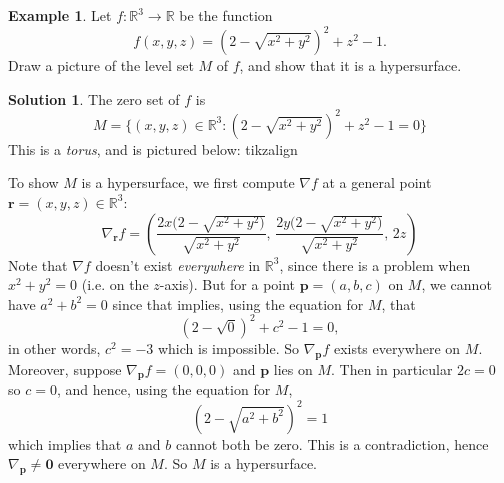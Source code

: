 \documentclass[a4paper,11pt]{book}
\theoremstyle{definition}
\newtheorem{example_environment}{Example}[chapter]
\newtheorem*{solution}{Solution}
\newcommand{\ve}[1]{\mathbf{#1}}
\newenvironment{example}
	{
		\begin{oframed} 
		\begin{example_environment}
	}
	{
		\end{example_environment}
		\end{oframed}
	}
\begin{document}
\begin{appendices}
\begin{example}Let $f : \mathbb{R}^3 \rightarrow \mathbb{R}$ be the function
\[
 f(x,y,z) = (2-\sqrt{x^2 + y^2})^2 + z^2 - 1.
\]
Draw a picture of the level set $M$ of $f$, and show that it is a hypersurface.
\begin{solution}
The zero set of $f$ is 
\[
  M = \{ (x,y,z) \in \mathbb{R}^3 : (2-\sqrt{x^2 + y^2})^2 + z^2 - 1 = 0 \}
\]
This is a {\em torus}, and is pictured below: tikzalign
\begin{center}
\end{center}


To show $M$ is a hypersurface, we first compute $\nabla f$ at a general point $\ve{r} = (x,y,z) \in \mathbb{R}^3$:
\[
 \nabla_\ve{r} f = \left( \frac{2x(2 - \sqrt{x^2 + y^2)}}{\sqrt{x^2 + y^2}}, \, \frac{2y(2 - \sqrt{x^2 + y^2)}}{\sqrt{x^2 + y^2}}, \, 2z \right)
\]
Note that $\nabla f$ doesn't exist {\em everywhere} in $\mathbb{R}^3$, since there is a problem when $x^2 + y^2 = 0$ (i.e. on the $z$-axis). But for a point $\ve{p} = (a, b, c)$ on $M$, we cannot have $a^2 + b^2 = 0$ since that implies, using the equation for $M$, that
\[
 (2 - \sqrt{0})^2 + c^2 - 1 = 0,
\]
in other words, $c^2 = -3$ which is impossible. So $\nabla_\ve{p} f$ exists everywhere on $M$. Moreover, suppose $\nabla_\ve{p} f = (0,0,0)$ and $\ve{p}$ lies on $M$. Then in particular $2c = 0$ so $c=0$, and hence, using the equation for $M$, 
\[
 (2 - \sqrt{a^2 + b^2})^2 = 1
\]
which implies that $a$ and $b$ cannot both be zero. This is a contradiction, hence $\nabla_\ve{p} \neq \ve{0}$ everywhere on $M$. So $M$ is a hypersurface.
\end{solution}
\end{example}


\end{appendices}
\end{document}
